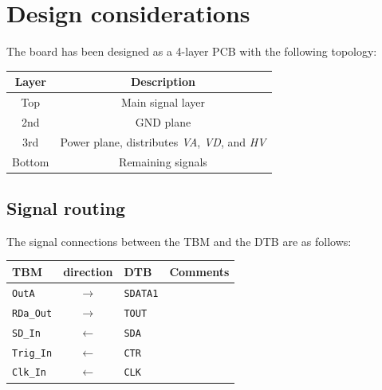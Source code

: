 \chapter{Design considerations}
The board has been designed as a 4-layer PCB with the following topology:
\begin{center}
\begin{tabular}{cc}
	\toprule %
Layer & Description \\
	\midrule %
Top & Main signal layer \\
2nd & GND plane \\
3rd & Power plane, distributes \emph{VA}, \emph{VD}, and \emph{HV} \\
Bottom & Remaining signals \\
	\bottomrule %
\end{tabular}
\end{center}

\section{Signal routing}

The signal connections between the TBM and the DTB are as follows:
\begin{center}
\begin{tabular}{lcll}
    \toprule %
    TBM & direction & DTB & Comments \\
    \midrule %
    \texttt{OutA}        & $\rightarrow$ & \texttt{SDATA1} & \\
    \texttt{RDa\_Out}    & $\rightarrow$ & \texttt{TOUT}   & \\
    \texttt{SD\_In}      & $\leftarrow$  & \texttt{SDA}    & \\
    \texttt{Trig\_In}    & $\leftarrow$  & \texttt{CTR}    & \\
    \texttt{Clk\_In}     & $\leftarrow$  & \texttt{CLK}    & \\
    \bottomrule %
\end{tabular}
\end{center}


